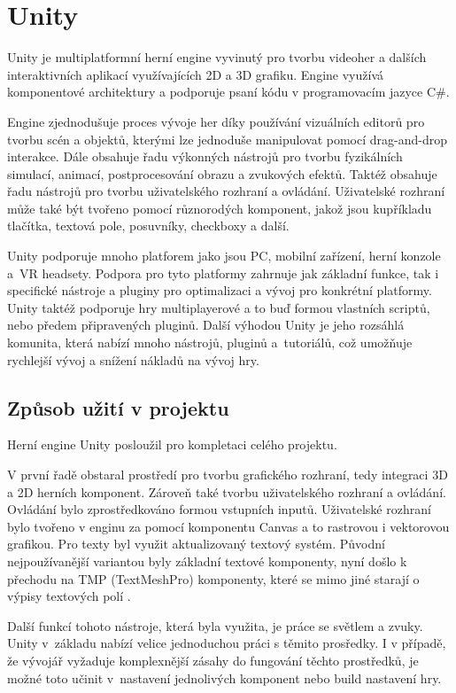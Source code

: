\section{Unity}
\label{sec:unity}

Unity je multiplatformní herní engine vyvinutý pro tvorbu videoher a dalších interaktivních aplikací využívajících 2D a 3D grafiku. Engine využívá komponentové architektury a podporuje psaní kódu v programovacím jazyce C\#. \cite{unity}

Engine zjednodušuje proces vývoje her díky používání vizuálních editorů pro tvorbu scén a objektů, kterými lze jednoduše manipulovat pomocí drag-and-drop interakce. Dále obsahuje řadu výkonných nástrojů pro tvorbu fyzikálních simulací, animací, postprocesování obrazu a zvukových efektů. Taktéž obsahuje řadu nástrojů pro tvorbu uživatelského rozhraní a ovládání. Uživatelské rozhraní může také být tvořeno pomocí různorodých komponent, jakož jsou kupříkladu tlačítka, textová pole, posuvníky, checkboxy a další. \cite{unity}

Unity podporuje mnoho platforem jako jsou PC, mobilní zařízení, herní konzole a~VR headsety. Podpora pro tyto platformy zahrnuje jak základní funkce, tak i specifické nástroje a pluginy pro optimalizaci a vývoj pro konkrétní platformy. Unity taktéž podporuje hry multiplayerové a to buď formou vlastních scriptů, nebo předem připravených pluginů. Další výhodou Unity je jeho rozsáhlá komunita, která nabízí mnoho nástrojů, pluginů a~tutoriálů, což umožňuje rychlejší vývoj a snížení nákladů na vývoj hry.

\subsection{Způsob užití v projektu}

Herní engine Unity posloužil pro kompletaci celého projektu.

V první řadě obstaral prostředí pro tvorbu grafického rozhraní, tedy integraci 3D a 2D herních komponent. Zároveň také tvorbu uživatelského rozhraní a ovládání. Ovládání bylo zprostředkováno formou vstupních inputů. Uživatelské rozhraní bylo tvořeno v enginu za pomocí komponentu Canvas a to rastrovou i vektorovou grafikou. Pro texty byl využit aktualizovaný textový systém. Původní nejpoužívanější variantou byly základní textové komponenty, nyní došlo k přechodu na TMP (TextMeshPro) komponenty, které se mimo jiné starají o výpisy textových polí \cite{unity_tmp}.

Další funkcí tohoto nástroje, která byla využita, je práce se světlem a zvuky. Unity v~základu nabízí velice jednoduchou práci s těmito prosředky. I v případě, že vývojář vyžaduje komplexnější zásahy do fungování těchto prostředků, je možné toto učinit v~nastavení jednolivých komponent nebo build nastavení hry.

